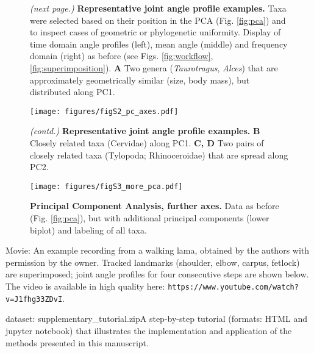 \begin{figure} [b!]
  \caption{
\textit{(next page.)}
\textbf{Representative joint angle profile examples.}
Taxa were selected based on their position in the PCA (Fig. \ref*{fig:pca}) and to inspect cases of geometric or phylogenetic uniformity.
Display of time domain angle profiles (left), mean angle (middle) and frequency domain (right) as before (see Figs. \ref*{fig:workflow}, \ref*{fig:superimposition}).
\textbf{A} Two genera (\textit{Taurotragus}, \textit{Alces}) that are approximately geometrically similar (size, body mass), but distributed along PC1. %
  }
\end{figure}
\addtocounter{figure}{-1}

\pagebreak
\begin{figure}[pt]
\centering
\texttt{[image: figures/figS2\_pc\_axes.pdf]}
\caption[Representative Examples]{
\textit{(contd.)}
\textbf{Representative joint angle profile examples.}
\textbf{B} Closely related taxa (Cervidae) along PC1.
\textbf{C, D} Two pairs of closely related taxa (Tylopoda; Rhinoceroidae) that are spread along PC2.
 }
\label{fig:examples}
\end{figure}

\pagebreak
\begin{figure}[pt]
\centering
\texttt{[image: figures/figS3\_more\_pca.pdf]}
\caption[Further PC Axes]{\textbf{Principal Component Analysis, further axes.} Data as before (Fig. \ref*{fig:pca}), but with additional principal components (lower biplot) and labeling of all taxa.
 }
\label{fig:more_pca}
\end{figure}



\FloatBarrier

%
Movie: {An example recording from a walking lama, obtained by the authors with permission by the owner. Tracked landmarks (shoulder, elbow, carpus, fetlock) are superimposed; joint angle profiles for four consecutive steps are shown below. The video is available in high quality here: \nolinkurl{https://www.youtube.com/watch?v=J1fhg33ZDvI}. }\label{supp:movie1}

dataset: {supplementary\_tutorial.zip}{A step-by-step tutorial (formats: HTML and jupyter notebook) that illustrates the implementation and application of the methods presented in this manuscript.}\label{supp:tutorial}

